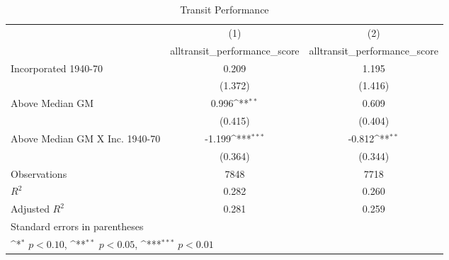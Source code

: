 \begin{table}[htbp]\centering
\def\sym#1{\ifmmode^{#1}\else\(^{#1}\)\fi}
\caption{Transit Performance}
\begin{tabular}{l*{2}{c}}
\hline\hline
                    &\multicolumn{1}{c}{(1)}&\multicolumn{1}{c}{(2)}\\
                    &\multicolumn{1}{c}{alltransit\_performance\_score}&\multicolumn{1}{c}{alltransit\_performance\_score}\\
\hline
Incorporated 1940-70&       0.209         &       1.195         \\
                    &     (1.372)         &     (1.416)         \\
[1em]
Above Median GM     &       0.996\sym{**} &       0.609         \\
                    &     (0.415)         &     (0.404)         \\
[1em]
Above Median GM X Inc. 1940-70&      -1.199\sym{***}&      -0.812\sym{**} \\
                    &     (0.364)         &     (0.344)         \\
\hline
Observations        &        7848         &        7718         \\
\(R^{2}\)           &       0.282         &       0.260         \\
Adjusted \(R^{2}\)  &       0.281         &       0.259         \\
\hline\hline
\multicolumn{3}{l}{\footnotesize Standard errors in parentheses}\\
\multicolumn{3}{l}{\footnotesize \sym{*} \(p<0.10\), \sym{**} \(p<0.05\), \sym{***} \(p<0.01\)}\\
\end{tabular}
\end{table}
